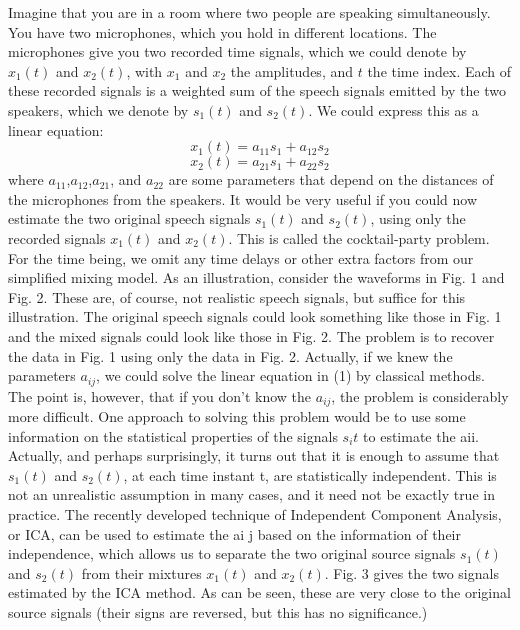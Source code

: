 \documentclass[12pt, a4paper, onecolumn]{IEEEtran}
\begin{document}
Imagine that you are in a room where two people are speaking simultaneously. You have two microphones, which you hold in different locations. The microphones give you two recorded time signals, which we could denote by $x_1(t)$ and $x_2(t)$, with $x_1$ and $x_2$ the amplitudes, and $t$ the time index. Each of these recorded signals is a weighted sum of the speech signals emitted by the two speakers, which we denote by $s_1(t)$ and $s_2(t)$. We could express this as a linear equation:
\begin{equation}
x_1(t) = a_{11}s_1 + a_{12}s_2
\end{equation}
\begin{equation}
x_2(t) = a_{21}s_1 + a_{22}s_2
\end{equation}
where $a_{11}$,$a_{12}$,$a_{21}$, and $a_{22}$ are some parameters that depend on the distances of the microphones from the speakers. It would be very useful if you could now estimate the two original speech signals $s_1(t)$ and $s_2(t)$, using only the recorded signals $x_1(t)$ and $x_2(t)$. This is called the cocktail-party problem. For the time being, we omit any time delays or other extra factors from our simplified mixing model.
As an illustration, consider the waveforms in Fig. 1 and Fig. 2. These are, of course, not realistic speech signals, but suffice for this illustration. The original speech signals could look something like those in Fig. 1 and the mixed signals could look like those in Fig. 2. The problem is to recover the data in Fig. 1 using only the data in Fig. 2.
Actually, if we knew the parameters $a_{ij}$, we could solve the linear equation in (1) by classical methods. The point is, however, that if you don’t know the $a_{ij}$, the problem is considerably more difficult.
One approach to solving this problem would be to use some information on the statistical properties of the signals $s_i{t}$ to estimate the aii. Actually, and perhaps surprisingly, it turns out that it is enough to assume that $s_1(t)$ and $s_2(t)$, at each time instant t, are statistically independent. This is not an unrealistic assumption in many cases, and it need not be exactly true in practice. The recently developed technique of Independent Component Analysis, or ICA, can be used to estimate the ai j based on the information of their independence, which allows us to separate the two original source signals $s_1(t)$ and $s_2(t)$ from their mixtures $x_1(t)$ and $x_2(t)$. Fig. 3 gives the two signals estimated by the ICA method. As can be seen, these are very close to the original source signals (their signs are reversed, but this has no significance.)
\end{document}
